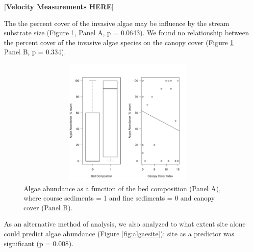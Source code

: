 \documentclass{article}\usepackage[]{graphicx}\usepackage[]{color}
\newenvironment{knitrout}{}{} %
\begin{document}
\textbf{[Velocity Measurements HERE]}

The the percent cover of the invasive algae may be influence by the stream substrate size (Figure \ref{fig:algae}, Panel A, p = 0.0643). We found no relationship between the percent cover of the invasive algae species on the canopy cover (Figure \ref{fig:algae} Panel B, p = 0.334).

\begin{figure}[!ht]
\begin{knitrout}
\color{fgcolor}
\includegraphics[width=5in,height=2.5in]{figure/unnamed-chunk-2-1} 

\end{knitrout}
\caption{Algae abundance as a function of the bed composition (Panel A), where course sediments = 1 and fine sediments = 0 and canopy cover (Panel B).}
\label{fig:algae}
\end{figure}

As an alternative method of analysis, we also analyzed to what extent site alone could predict algae abundance (Figure \ref{fig:algaesite}): site as a predictor was significant (p = 0.008).
\end{document}
